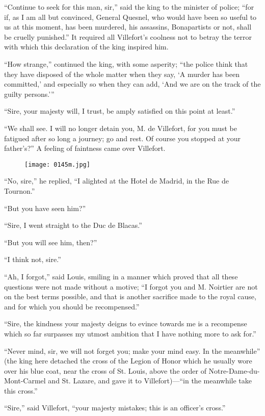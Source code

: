 “Continue to seek for this man, sir,” said the king to the minister of
police; “for if, as I am all but convinced, General Quesnel, who would
have been so useful to us at this moment, has been murdered, his
assassins, Bonapartists or not, shall be cruelly punished.” It required
all Villefort’s coolness not to betray the terror with which this
declaration of the king inspired him.

“How strange,” continued the king, with some asperity; “the police
think that they have disposed of the whole matter when they say, ‘A
murder has been committed,’ and especially so when they can add, ‘And
we are on the track of the guilty persons.’”

“Sire, your majesty will, I trust, be amply satisfied on this point at
least.”

“We shall see. I will no longer detain you, M. de Villefort, for you
must be fatigued after so long a journey; go and rest. Of course you
stopped at your father’s?” A feeling of faintness came over Villefort.

\begin{figure}[ht]
\texttt{[image: 0145m.jpg]}
\end{figure}

“No, sire,” he replied, “I alighted at the Hotel de Madrid, in the Rue
de Tournon.”

“But you have seen him?”

“Sire, I went straight to the Duc de Blacas.”

“But you will see him, then?”

“I think not, sire.”

“Ah, I forgot,” said Louis, smiling in a manner which proved that all
these questions were not made without a motive; “I forgot you and M.
Noirtier are not on the best terms possible, and that is another
sacrifice made to the royal cause, and for which you should be
recompensed.”

“Sire, the kindness your majesty deigns to evince towards me is a
recompense which so far surpasses my utmost ambition that I have
nothing more to ask for.”

“Never mind, sir, we will not forget you; make your mind easy. In the
meanwhile” (the king here detached the cross of the Legion of Honor
which he usually wore over his blue coat, near the cross of St. Louis,
above the order of Notre-Dame-du-Mont-Carmel and St. Lazare, and gave
it to Villefort)—“in the meanwhile take this cross.”

“Sire,” said Villefort, “your majesty mistakes; this is an officer’s
cross.”

